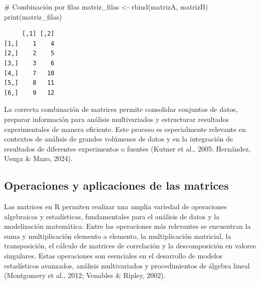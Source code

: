 \documentclass[
  spanish,
  a4paper,
  DIV=11,
  numbers=noendperiod,
  onepage,
  openany]{scrreprt}
\newenvironment{Shaded}{\begin{snugshade}}{\end{snugshade}}
\newcommand{\CommentTok}[1]{\textcolor[rgb]{0.37,0.37,0.37}{#1}}
\newcommand{\FunctionTok}[1]{\textcolor[rgb]{0.28,0.35,0.67}{#1}}
\newcommand{\NormalTok}[1]{\textcolor[rgb]{0.00,0.23,0.31}{#1}}
\newcommand{\OtherTok}[1]{\textcolor[rgb]{0.00,0.23,0.31}{#1}}
\begin{document}
\begin{Shaded}
\begin{Highlighting}[]
\CommentTok{\# Combinación por filas}
\NormalTok{matriz\_filas }\OtherTok{\textless{}{-}} \FunctionTok{rbind}\NormalTok{(matrizA, matrizB)}
\FunctionTok{print}\NormalTok{(matriz\_filas)}
\end{Highlighting}
\end{Shaded}

\begin{verbatim}
     [,1] [,2]
[1,]    1    4
[2,]    2    5
[3,]    3    6
[4,]    7   10
[5,]    8   11
[6,]    9   12
\end{verbatim}

La correcta combinación de matrices permite consolidar conjuntos de
datos, preparar información para análisis multivariados y estructurar
resultados experimentales de manera eficiente. Este proceso es
especialmente relevante en contextos de análisis de grandes volúmenes de
datos y en la integración de resultados de diferentes experimentos o
fuentes (Kutner et al., 2005; Hernández, Usuga \& Mazo, 2024).

\subsection{Operaciones y aplicaciones de las
matrices}\label{operaciones-y-aplicaciones-de-las-matrices}

Las matrices en R permiten realizar una amplia variedad de operaciones
algebraicas y estadísticas, fundamentales para el análisis de datos y la
modelización matemática. Entre las operaciones más relevantes se
encuentran la suma y multiplicación elemento a elemento, la
multiplicación matricial, la transposición, el cálculo de matrices de
correlación y la descomposición en valores singulares. Estas operaciones
son esenciales en el desarrollo de modelos estadísticos avanzados,
análisis multivariados y procedimientos de álgebra lineal (Montgomery et
al., 2012; Venables \& Ripley, 2002).
\end{document}
